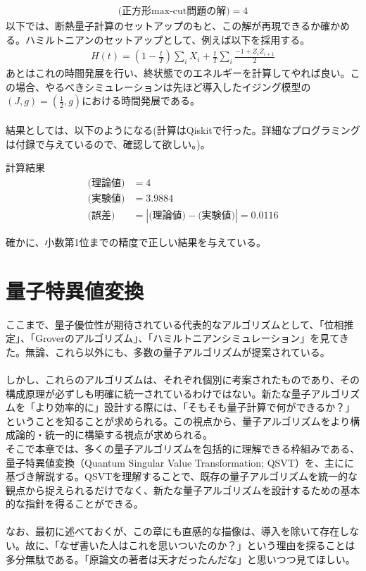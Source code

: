 \documentclass[a4paper,10.5pt]{article}
\numberwithin{equation}{section}
\begin{document}
\begin{align*}
    \text{(正方形max-cut問題の解)}=4
\end{align*}
以下では、断熱量子計算のセットアップのもと、この解が再現できるか確かめる。ハミルトニアンのセットアップとして、例えば以下を採用する。
\begin{align*}
    H(t)=(1-\frac{t}{T})\sum_{i}X_{i}+\frac{t}{T}\sum_{i}\frac{-1+Z_{i}Z_{i+1}}{2}
\end{align*}
あとはこれの時間発展を行い、終状態でのエネルギーを計算してやれば良い。この場合、やるべきシミュレーションは先ほど導入したイジング模型の$(J,g)=(\frac{1}{2},g)$における時間発展である。\\
\\
結果としては、以下のようになる(計算はQiskitで行った。詳細なプログラミングは付録で与えているので、確認して欲しい。)。
\begin{resultbox}{計算結果}
    \begin{align*}
    \text{(理論値)}&=4\\
    \text{(実験値)}&=3.9884\\
    \text{(誤差)}&=| \text{(理論値)}-\text{(実験値)}|=0.0116
\end{align*}
\end{resultbox}
確かに、小数第1位までの精度で正しい結果を与えている。

\section{量子特異値変換}
ここまで、量子優位性が期待されている代表的なアルゴリズムとして、「位相推定」、「Groverのアルゴリズム」、「ハミルトニアンシミュレーション」を見てきた。無論、これら以外にも、多数の量子アルゴリズムが提案されている。\\
\\
しかし、これらのアルゴリズムは、それぞれ個別に考案されたものであり、その構成原理が必ずしも明確に統一されているわけではない。新たな量子アルゴリズムを「より効率的に」設計する際には、「そもそも量子計算で何ができるか？」ということを知ることが求められる。この視点から、量子アルゴリズムをより構成論的・統一的に構築する視点が求められる。\\
そこで本章では、多くの量子アルゴリズムを包括的に理解できる枠組みである、量子特異値変換（Quantum Singular Value Transformation; QSVT）を、主に\cite{Low:2016sck}\cite{Low:2016znh}\cite{Gilyen:2018khw}に基づき解説する。QSVTを理解することで、既存の量子アルゴリズムを統一的な観点から捉えられるだけでなく、新たな量子アルゴリズムを設計するための基本的な指針を得ることができる。\\
\\
なお、最初に述べておくが、この章にも直感的な描像は、導入を除いて存在しない。故に、「なぜ書いた人はこれを思いついたのか？」という理由を探ることは多分無駄である。「原論文の著者は天才だったんだな」と思いつつ見てほしい。
\end{document}
